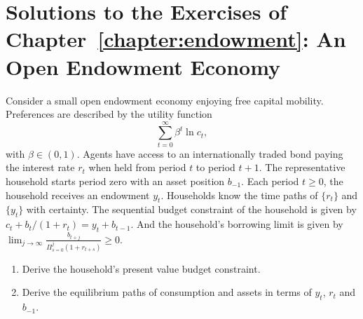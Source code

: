 \usepackage{amsmath}
\usepackage{amssymb}
\usepackage{float}

\setcounter{chapter}{2}
\renewcommand{\theequation}{\thechapter.\arabic{equation}EX}
\setcounter{equation}{0}
\setcounter{page}{1}
\chapter*{Solutions to the Exercises of Chapter~\ref{chapter:endowment}: An  Open  Endowment Economy }

\setcounter{section}{5}
\setcounter{exercise}{0}
\singlespacing

\begin{exercise} 

Consider a small open  endowment economy enjoying free capital mobility.  Preferences are described by the utility function
\[
 \sum_{t=0}^{\infty} \beta^t \ln c_t,
\]
with $\beta\in (0,1)$. Agents have access to an internationally traded  bond paying the interest rate $r_t$ when held from period $t$ to period $t+1$. 
The representative household starts period zero with an asset position $b_{-1}$. Each period $t\ge 0$, the household receives an endowment $y_t$. Households know the time paths of $\{r_t\}$ and $\{y_t\}$ with certainty. The sequential budget constraint of the household is given by $c_t + b_t/(1+r_t) = y_t + b_{t-1}$. And the household's borrowing limit is given by $\lim_{j\rightarrow \infty} \frac{b_{t+j}}{\Pi_{s=0}^j (1+r_{t+s})}\ge 0$.

\begin{enumerate}
  \item Derive the household's present value budget constraint. 
  \item Derive the equilibrium paths of consumption and assets in terms of $y_t$, $r_t$ and $b_{-1}$. 
\end{enumerate}


\end{exercise}
